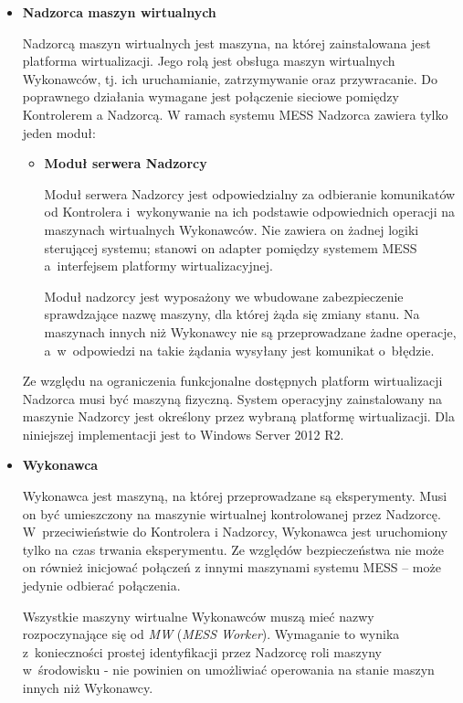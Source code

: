 \documentclass[a4paper,12pt,oneside]{article}
\begin{document}
\begin{itemize}
		\item \textbf{Nadzorca maszyn wirtualnych}
		
		Nadzorcą maszyn wirtualnych jest maszyna, na której zainstalowana jest platforma wirtualizacji. Jego rolą jest obsługa maszyn wirtualnych Wykonawców, tj. ich uruchamianie, zatrzymywanie oraz przywracanie. Do poprawnego działania wymagane jest połączenie sieciowe pomiędzy Kontrolerem a Nadzorcą. W ramach systemu MESS Nadzorca zawiera tylko jeden moduł:
		
		\begin{itemize}
			\item \textbf{Moduł serwera Nadzorcy}
			
			Moduł serwera Nadzorcy jest odpowiedzialny za odbieranie komunikatów od Kontrolera i~wykonywanie na ich podstawie odpowiednich operacji na maszynach wirtualnych Wykonawców. Nie zawiera on żadnej logiki sterującej systemu; stanowi on adapter pomiędzy systemem MESS a~interfejsem platformy wirtualizacyjnej. 
			
			Moduł nadzorcy jest wyposażony we wbudowane zabezpieczenie sprawdzające nazwę maszyny, dla której żąda się zmiany stanu. Na maszynach innych niż Wykonawcy nie są przeprowadzane żadne operacje, a~w~odpowiedzi na takie żądania wysyłany jest komunikat o~błędzie.
		\end{itemize}
		
		Ze względu na ograniczenia funkcjonalne dostępnych platform wirtualizacji Nadzorca musi być maszyną fizyczną. System operacyjny zainstalowany na maszynie Nadzorcy jest określony przez wybraną platformę wirtualizacji. Dla niniejszej implementacji jest to Windows Server 2012 R2.
		
		\item \textbf{Wykonawca}
		
		Wykonawca jest maszyną, na której przeprowadzane są eksperymenty. Musi on być umieszczony na maszynie wirtualnej kontrolowanej przez Nadzorcę. W~przeciwieństwie do Kontrolera i Nadzorcy, Wykonawca jest uruchomiony tylko na czas trwania eksperymentu. Ze względów bezpieczeństwa nie może on również inicjować połączeń z innymi maszynami systemu MESS -- może jedynie odbierać połączenia.
		
		Wszystkie maszyny wirtualne Wykonawców muszą mieć nazwy rozpoczynające się od \textit{MW} (\textit{MESS Worker}). Wymaganie to wynika z~konieczności prostej identyfikacji przez Nadzorcę roli maszyny w~środowisku - nie powinien on umożliwiać operowania na stanie maszyn innych niż Wykonawcy.
		

\end{itemize}
\end{document}
